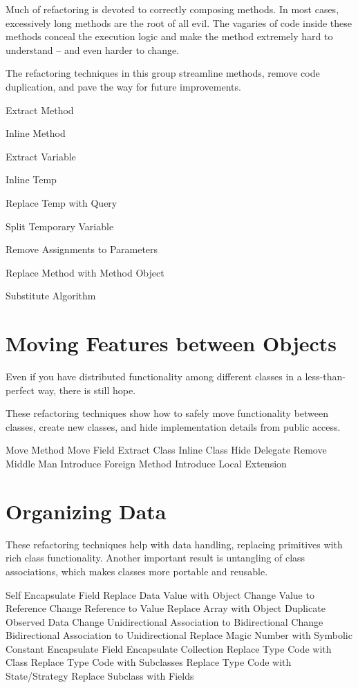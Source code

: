 \documentclass[11pt,a4paper,oneside]{book}
\begin{document}
Much of refactoring is devoted to correctly composing methods. In most cases, excessively long methods are the root of all evil. The vagaries of code inside these methods conceal the execution logic and make the method extremely hard to understand – and even harder to change.

The refactoring techniques in this group streamline methods, remove code duplication, and pave the way for future improvements.

    Extract Method
    
    
    Inline Method

    
    
    Extract Variable
    
    
    Inline Temp
    
    
    Replace Temp with Query
    
    Split Temporary Variable
    
    Remove Assignments to Parameters
    
    Replace Method with Method Object
    
    Substitute Algorithm


\section{Moving Features between Objects}

Even if you have distributed functionality among different classes in a less-than-perfect way, there is still hope.

These refactoring techniques show how to safely move functionality between classes, create new classes, and hide implementation details from public access.

    Move Method
    Move Field
    Extract Class
    Inline Class
    Hide Delegate
    Remove Middle Man
    Introduce Foreign Method
    Introduce Local Extension



\section{Organizing Data}

These refactoring techniques help with data handling, replacing primitives with rich class functionality. Another important result is untangling of class associations, which makes classes more portable and reusable.

    Self Encapsulate Field
    Replace Data Value with Object
    Change Value to Reference
    Change Reference to Value
    Replace Array with Object
    Duplicate Observed Data
    Change Unidirectional Association to Bidirectional
    Change Bidirectional Association to Unidirectional
    Replace Magic Number with Symbolic Constant
    Encapsulate Field
    Encapsulate Collection
    Replace Type Code with Class
    Replace Type Code with Subclasses
    Replace Type Code with State/Strategy
    Replace Subclass with Fields
\end{document}
